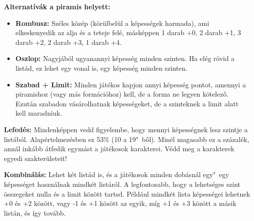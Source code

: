 \textbf{Alternatívák a piramis helyett:}

\begin{itemize}
    \item \textbf{Rombusz:} Széles közép (körülbelül a képességek harmada), ami elkeskenyedik az alja és a teteje felé, másképpen 1 darab +0, 2 darab +1, 3 darab +2, 2 darab +3, 1 darab +4.
    \item \textbf{Oszlop:} Nagyjából ugyanannyi képesség minden szinten. Ha elég rövid a listád, ez lehet egy vonal is, egy képesség minden szinten.
    \item \textbf{Szabad + Limit:} Minden játékos kapjon annyi képesség pontot, amennyi a piramishoz (vagy más formációhoz) kell, de a forma ne legyen kötelező. Ezután szabadon vásárolhatnak képességeket, de a szinteknek a limit alatt kell maradniuk.
\end{itemize}

\textbf{Lefedés:} Mindenképpen vedd figyelembe, hogy mennyi képességnek lesz szintje a listából. Alapértelmezésben ez 53\% (10 a 19"~ből). Minél magasabb ez a százalék, annál inkább átfedik egymást a játékosok karakterei. Védd meg a karakterek egyedi szakterületeit!

\textbf{Kombinálás:} Lehet két listád is, és a játékosok minden dobásnál egy"~egy képességet használnak mindkét listáról. A legfontosabb, hogy a lehetséges szint összegeket nulla és a limit között tartsd. Például mindkét lista képességei lehetnek +0 és +2 között, vagy -1 és +1 között az egyik, míg +1 és +3 között a másik listán, és így tovább.
